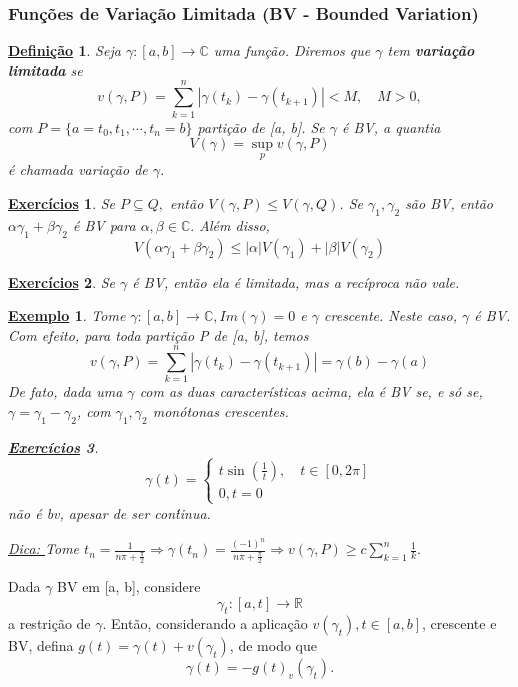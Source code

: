 \documentclass{article}
\newtheorem*{def*}{\underline{Defini\c c\~ao}}
\newtheorem{example}{\underline{Exemplo}}[section]
\newtheorem*{exer*}{\underline{Exerc\'icios}}
\begin{document}
  \subsubsection{Fun\c c\~oes de Varia\c c\~ao Limitada (BV - Bounded Variation)}
  \begin{def*}
    Seja $\gamma:[a, b]\rightarrow \mathbb{C}$ uma fun\c c\~ao. Diremos que $\gamma$ tem \textbf{varia\c c\~ao limitada} se 
    $$
    v(\gamma, P) = \sum\limits_{k=1}^{n}|\gamma(t_{k}) - \gamma(t_{k+1})| < M, \quad M > 0,
    $$
    com $P = \{a=t_{0}, t_1, \cdots, t_n = b\} $ parti\c c\~ao de [a, b]. Se $\gamma$ \'e BV, a quantia
    $$
    V(\gamma) = \sup_p v(\gamma, P)
    $$
    \'e chamada varia\c c\~ao de $\gamma$.
  \end{def*}
  \begin{exer*}
    Se $P\subseteq{Q}, $ ent\~ao $V(\gamma, P)\leq{V(\gamma, Q)}$. Se $\gamma_1, \gamma_2$ s\~ao BV, ent\~ao $\alpha \gamma_1 + \beta \gamma_2$
    \'e BV para $\alpha, \beta\in \mathbb{C}.$ Al\'em disso, 
    $$
    V(\alpha \gamma_1 + \beta \gamma_2) \leq |\alpha|V(\gamma_1) + |\beta|V(\gamma_2)
    $$
  \end{exer*}
  \begin{exer*}
    Se $\gamma$ \'e BV, ent\~ao ela \'e limitada, mas a rec\'iproca n\~ao vale.
  \end{exer*}
  \begin{example}
    Tome $\gamma:[a, b]\rightarrow \mathbb{C}, Im(\gamma) = 0$ e $\gamma$ crescente. Neste caso, $\gamma$ \'e BV. Com efeito, para
    toda parti\c c\~ao P de [a, b], temos 
    $$
    v(\gamma, P) = \sum\limits_{k=1}^{n}|\gamma(t_{k}) - \gamma(t_{k+1})| = \gamma(b) - \gamma(a)
    $$
    De fato, dada uma $\gamma$ com as duas caracter\'isticas acima, ela \'e BV se, e s\'o se, $\gamma = \gamma_1 - \gamma_2$, com
    $\gamma_1, \gamma_2$ mon\'otonas crescentes.
    \begin{exer*}
      $$
      \gamma(t) = \left\{\begin{array}{ll}
          t\sin{(\frac{1}{t})}, \quad t\in[0, 2\pi] \\
          0, t= 0
      \end{array}\right.
      $$
      n\~ao \'e bv, apesar de ser con\'tinua.

      \underline{Dica: } Tome $t_{n} =\displaystyle \frac{1}{n\pi + \frac{\pi}{2}}\Rightarrow \gamma(t_{n}) =\displaystyle \frac{(-1)^n}{n\pi + \frac{\pi}{2}}\Rightarrow
      v(\gamma, P) \geq c \sum\limits_{k=1}^{n}\frac{1}{k}.$
    \end{exer*}
  \end{example}
  Dada $\gamma$ BV em [a, b], considere 
  $$
  \gamma_t:[a, t]\rightarrow \mathbb{R}
  $$
  a restri\c c\~ao de $\gamma.$ Ent\~ao, considerando a aplica\c c\~ao $v(\gamma_t), t\in[a, b]$, crescente e BV, defina $
  g(t) = \gamma(t) + v(\gamma_t)$, de modo que
  $$
  \gamma(t) = -g(t) _ v(\gamma_t).
  $$
  \newpage
\end{document}
